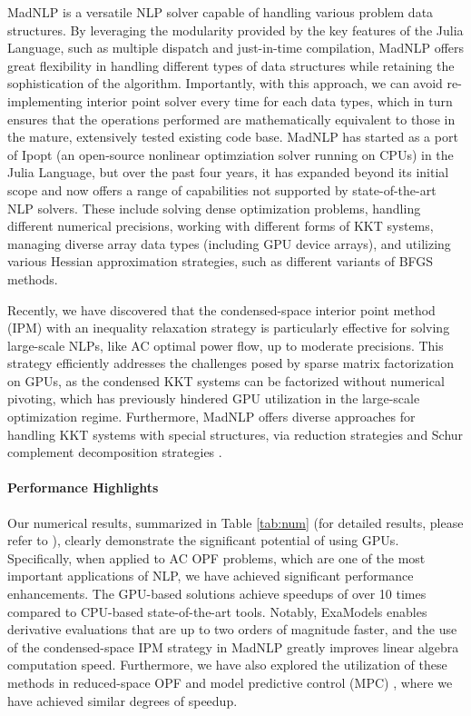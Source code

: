 MadNLP is a versatile NLP solver capable of
handling various problem data structures. By leveraging the modularity
provided by the key features of the Julia Language, such as multiple
dispatch and just-in-time compilation, MadNLP offers great flexibility
in handling different types of data structures while retaining the
sophistication of the algorithm. Importantly, with this approach, we can avoid
re-implementing interior point solver every time for each data types,
which in turn ensures that the operations performed are mathematically
equivalent to those in the mature, extensively tested existing code
base. MadNLP has started as a port of Ipopt (an open-source nonlinear
optimziation solver running on CPUs) in the Julia Language, but over
the past four years, it has expanded beyond its initial scope and now
offers a range of capabilities not supported by state-of-the-art NLP
solvers. These include solving dense optimization problems, handling
different numerical precisions, working with different forms of KKT
systems, managing diverse array data types (including GPU device
arrays), and utilizing various Hessian approximation strategies, such
as different variants of BFGS methods.

Recently, we have discovered that the condensed-space interior point
method (IPM) with an inequality relaxation strategy is particularly
effective for solving large-scale NLPs, like AC optimal power flow, up
to moderate precisions. This strategy efficiently addresses the
challenges posed by sparse matrix factorization on GPUs, as the
condensed KKT systems can be factorized without numerical pivoting,
which has previously hindered GPU utilization in the large-scale
optimization regime.  Furthermore, MadNLP offers diverse approaches
for handling KKT systems with special structures, via reduction
strategies \cite{pacaud2023accelerating} and Schur complement decomposition
strategies \cite{pacaud2023parallel}.



\paragraph{Performance Highlights}

Our numerical results, summarized in Table \ref{tab:num} (for detailed
results, please refer to \cite{shin2023accelerating}), clearly
demonstrate the significant potential of using GPUs. Specifically,
when applied to AC OPF problems, which are one of the most important
applications of NLP, we have achieved significant performance
enhancements. The GPU-based solutions achieve speedups of over 10
times compared to CPU-based state-of-the-art tools. Notably, ExaModels
enables derivative evaluations that are up to two orders of magnitude
faster, and the use of the condensed-space IPM strategy in MadNLP
greatly improves linear algebra computation speed. Furthermore, we
have also explored the utilization of these methods in reduced-space
OPF \cite{pacaud2023accelerating} and model predictive control (MPC)
\cite{cole2023exploiting}, where we have achieved similar degrees of
speedup.

